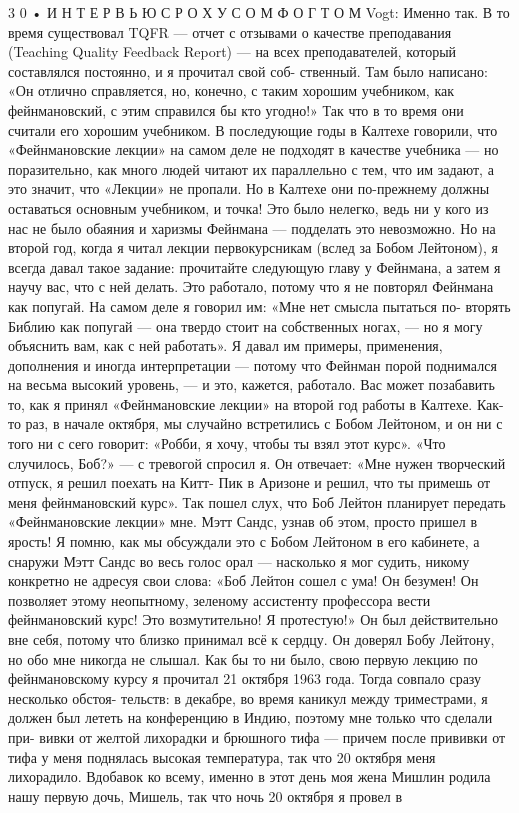 \documentclass[11pt,oneside]{article}
\begin{document}
3 0 • И Н Т Е Р В Ь Ю  С  Р О Х У С О М  Ф О Г Т О М Vogt: Именно так. В то время существовал TQFR --- отчет с отзывами о качестве преподавания (Teaching Quality Feedback Report) --- на всех преподавателей, который составлялся постоянно, и я прочитал свой соб- ственный. Там было написано: «Он отлично справляется, но, конечно, с таким хорошим учебником, как фейнмановский, с этим справился бы кто угодно!» Так что в то время они считали его хорошим учебником. В последующие годы в Калтехе говорили, что «Фейнмановские лекции» на самом деле не подходят в качестве учебника --- но поразительно, как много людей читают их параллельно с тем, что им задают, а это значит, что «Лекции» не пропали. Но в Калтехе они по-прежнему должны оставаться основным учебником, и точка! Это было нелегко, ведь ни у кого из нас не было обаяния и харизмы Фейнмана --- подделать это невозможно. Но на второй год, когда я читал лекции первокурсникам (вслед за Бобом Лейтоном), я всегда давал такое задание: прочитайте следующую главу у Фейнмана, а затем я научу вас, что с ней делать. Это работало, потому что я не повторял Фейнмана как попугай. На самом деле я говорил им: «Мне нет смысла пытаться по- вторять Библию как попугай --- она твердо стоит на собственных ногах, --- но я могу объяснить вам, как с ней работать». Я давал им примеры, применения, дополнения и иногда интерпретации --- потому что Фейнман порой поднимался на весьма высокий уровень, --- и это, кажется, работало. Вас может позабавить то, как я принял «Фейнмановские лекции» на второй год работы в Калтехе. Как-то раз, в начале октября, мы случайно встретились с Бобом Лейтоном, и он ни с того ни с сего говорит: «Робби, я хочу, чтобы ты взял этот курс». «Что случилось, Боб?» --- с тревогой спросил я. Он отвечает: «Мне нужен творческий отпуск, я решил поехать на Китт- Пик в Аризоне и решил, что ты примешь от меня фейнмановский курс». Так пошел слух, что Боб Лейтон планирует передать «Фейнмановские лекции» мне. Мэтт Сандс, узнав об этом, просто пришел в ярость! Я помню, как мы обсуждали это с Бобом Лейтоном в его кабинете, а снаружи Мэтт Сандс во весь голос орал --- насколько я мог судить, никому конкретно не адресуя свои слова: «Боб Лейтон сошел с ума! Он безумен! Он позволяет этому неопытному, зеленому ассистенту профессора вести фейнмановский курс! Это возмутительно! Я протестую!» Он был действительно вне себя, потому что близко принимал всё к сердцу. Он доверял Бобу Лейтону, но обо мне никогда не слышал. Как бы то ни было, свою первую лекцию по фейнмановскому курсу я прочитал 21 октября 1963 года. Тогда совпало сразу несколько обстоя- тельств: в декабре, во время каникул между триместрами, я должен был лететь на конференцию в Индию, поэтому мне только что сделали при- вивки от желтой лихорадки и брюшного тифа --- причем после прививки от тифа у меня поднялась высокая температура, так что 20 октября меня лихорадило. Вдобавок ко всему, именно в этот день моя жена Мишлин родила нашу первую дочь, Мишель, так что ночь 20 октября я провел в\par
\end{document}
